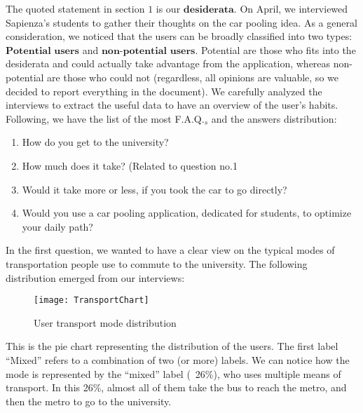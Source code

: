 \documentclass{article}
\begin{document}
The quoted statement in section $1$ is our $\textbf{desiderata}$. On April, we interviewed Sapienza's students to gather their thoughts on the car pooling idea. As a general consideration, we noticed that the users can be broadly classified into two types: $\textbf{Potential users}$ and $\textbf{non-potential users}$. Potential are those who fits into the desiderata and could actually take advantage from the application, whereas non-potential are those who could not (regardless, all opinions are valuable, so we decided to report everything in the document). We carefully analyzed the interviews to extract the useful data to have an overview of the user's habits. Following, we have the list of the most F.A.Q.$_{s}$ and the answers distribution: \newline 

\begin{enumerate}
    \item How do you get to the university? 
    \item How much does it take? (Related to question no.1
    \item Would it take more or less, if you took the car to go directly?
    \item Would you use a car pooling application, dedicated for students, to optimize your daily path?
\end{enumerate} 

\newpage

In the first question, we wanted to have a clear view on the typical modes of transportation people use to commute to the university. The following distribution emerged from our interviews:

\begin{figure}[htbp]
  \centering
    \texttt{[image: TransportChart]}
    \caption{User transport mode distribution}
\end{figure}



This is the pie chart representing the distribution of the users. The first label “Mixed” refers to a combination of two (or more) labels. We can notice how the mode is represented by the “mixed” label (~26\%), who uses multiple means of transport. In this 26\%, almost all of them take the bus to reach the metro, and then the metro to go to the university.
\end{document}
